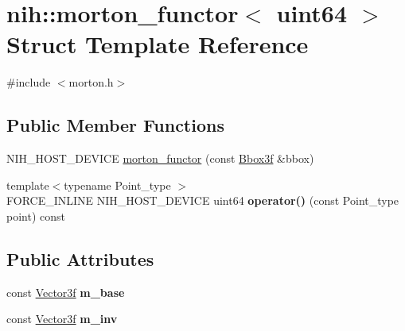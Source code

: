 \hypertarget{structnih_1_1morton__functor_3_01uint64_01_4}{
\section{nih\-:\-:morton\-\_\-functor$<$ uint64 $>$ \-Struct \-Template \-Reference}
\label{structnih_1_1morton__functor_3_01uint64_01_4}
}


{\ttfamily \#include $<$morton.\-h$>$}

\subsection*{\-Public \-Member \-Functions}
\begin{DoxyCompactItemize}
\item 
\-N\-I\-H\-\_\-\-H\-O\-S\-T\-\_\-\-D\-E\-V\-I\-C\-E \hyperlink{structnih_1_1morton__functor_3_01uint64_01_4_a9344bbcf4abd747f4543ecb7a86e5b1e}{morton\-\_\-functor} (const \hyperlink{structnih_1_1_bbox}{\-Bbox3f} \&bbox)
\item 
\hypertarget{structnih_1_1morton__functor_3_01uint64_01_4_a0668bc96e8db64e9c21e0909cb6bc28e}{
{\footnotesize template$<$typename Point\-\_\-type $>$ }\\\-F\-O\-R\-C\-E\-\_\-\-I\-N\-L\-I\-N\-E \-N\-I\-H\-\_\-\-H\-O\-S\-T\-\_\-\-D\-E\-V\-I\-C\-E uint64 {\bfseries operator()} (const \-Point\-\_\-type point) const }
\label{structnih_1_1morton__functor_3_01uint64_01_4_a0668bc96e8db64e9c21e0909cb6bc28e}

\end{DoxyCompactItemize}
\subsection*{\-Public \-Attributes}
\begin{DoxyCompactItemize}
\item 
\hypertarget{structnih_1_1morton__functor_3_01uint64_01_4_a095d95ea7745a10dac90842ad5749359}{
const \hyperlink{structnih_1_1_vector}{\-Vector3f} {\bfseries m\-\_\-base}}
\label{structnih_1_1morton__functor_3_01uint64_01_4_a095d95ea7745a10dac90842ad5749359}

\item 
\hypertarget{structnih_1_1morton__functor_3_01uint64_01_4_aec428ce2c2f94b58bf7c843cc33436c8}{
const \hyperlink{structnih_1_1_vector}{\-Vector3f} {\bfseries m\-\_\-inv}}
\label{structnih_1_1morton__functor_3_01uint64_01_4_aec428ce2c2f94b58bf7c843cc33436c8}

\end{DoxyCompactItemize}


